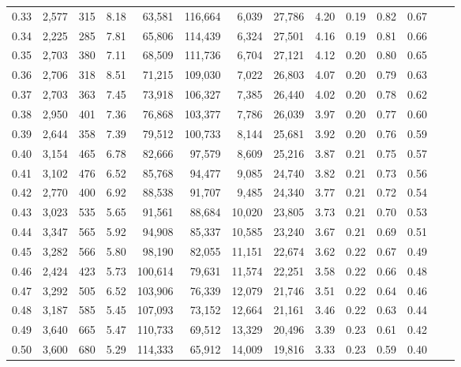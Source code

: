 \begin{tabular}{rrrrrrrrrrrrrr}
0.33 &  2,577 &  315 &    8.18 &   63,581 &  116,664 &   6,039 &  27,786 &  4.20 &  0.19 &  0.82 &      0.67 \\
0.34 &  2,225 &  285 &    7.81 &   65,806 &  114,439 &   6,324 &  27,501 &  4.16 &  0.19 &  0.81 &      0.66 \\
0.35 &  2,703 &  380 &    7.11 &   68,509 &  111,736 &   6,704 &  27,121 &  4.12 &  0.20 &  0.80 &      0.65 \\
0.36 &  2,706 &  318 &    8.51 &   71,215 &  109,030 &   7,022 &  26,803 &  4.07 &  0.20 &  0.79 &      0.63 \\
0.37 &  2,703 &  363 &    7.45 &   73,918 &  106,327 &   7,385 &  26,440 &  4.02 &  0.20 &  0.78 &      0.62 \\
0.38 &  2,950 &  401 &    7.36 &   76,868 &  103,377 &   7,786 &  26,039 &  3.97 &  0.20 &  0.77 &      0.60 \\
0.39 &  2,644 &  358 &    7.39 &   79,512 &  100,733 &   8,144 &  25,681 &  3.92 &  0.20 &  0.76 &      0.59 \\
0.40 &  3,154 &  465 &    6.78 &   82,666 &   97,579 &   8,609 &  25,216 &  3.87 &  0.21 &  0.75 &      0.57 \\
0.41 &  3,102 &  476 &    6.52 &   85,768 &   94,477 &   9,085 &  24,740 &  3.82 &  0.21 &  0.73 &      0.56 \\
0.42 &  2,770 &  400 &    6.92 &   88,538 &   91,707 &   9,485 &  24,340 &  3.77 &  0.21 &  0.72 &      0.54 \\
0.43 &  3,023 &  535 &    5.65 &   91,561 &   88,684 &  10,020 &  23,805 &  3.73 &  0.21 &  0.70 &      0.53 \\
0.44 &  3,347 &  565 &    5.92 &   94,908 &   85,337 &  10,585 &  23,240 &  3.67 &  0.21 &  0.69 &      0.51 \\
0.45 &  3,282 &  566 &    5.80 &   98,190 &   82,055 &  11,151 &  22,674 &  3.62 &  0.22 &  0.67 &      0.49 \\
0.46 &  2,424 &  423 &    5.73 &  100,614 &   79,631 &  11,574 &  22,251 &  3.58 &  0.22 &  0.66 &      0.48 \\
0.47 &  3,292 &  505 &    6.52 &  103,906 &   76,339 &  12,079 &  21,746 &  3.51 &  0.22 &  0.64 &      0.46 \\
0.48 &  3,187 &  585 &    5.45 &  107,093 &   73,152 &  12,664 &  21,161 &  3.46 &  0.22 &  0.63 &      0.44 \\
0.49 &  3,640 &  665 &    5.47 &  110,733 &   69,512 &  13,329 &  20,496 &  3.39 &  0.23 &  0.61 &      0.42 \\
0.50 &  3,600 &  680 &    5.29 &  114,333 &   65,912 &  14,009 &  19,816 &  3.33 &  0.23 &  0.59 &      0.40 \\

\end{tabular}
